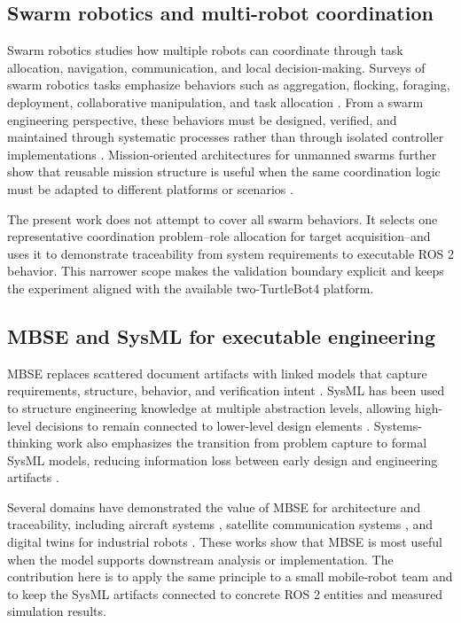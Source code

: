 \documentclass{ieeeaccess}
\begin{document}
\subsection{Swarm robotics and multi-robot coordination}
Swarm robotics studies how multiple robots can coordinate through task allocation, navigation, communication, and local decision-making. Surveys of swarm robotics tasks emphasize behaviors such as aggregation, flocking, foraging, deployment, collaborative manipulation, and task allocation \cite{Bayindir2016}. From a swarm engineering perspective, these behaviors must be designed, verified, and maintained through systematic processes rather than through isolated controller implementations \cite{Manuele2013}. Mission-oriented architectures for unmanned swarms further show that reusable mission structure is useful when the same coordination logic must be adapted to different platforms or scenarios \cite{Giles2019}.

The present work does not attempt to cover all swarm behaviors. It selects one representative coordination problem--role allocation for target acquisition--and uses it to demonstrate traceability from system requirements to executable ROS 2 behavior. This narrower scope makes the validation boundary explicit and keeps the experiment aligned with the available two-TurtleBot4 platform.

\subsection{MBSE and SysML for executable engineering}
MBSE replaces scattered document artifacts with linked models that capture requirements, structure, behavior, and verification intent \cite{Sannes2022,Zihang2024}. SysML has been used to structure engineering knowledge at multiple abstraction levels, allowing high-level decisions to remain connected to lower-level design elements \cite{Luca2011}. Systems-thinking work also emphasizes the transition from problem capture to formal SysML models, reducing information loss between early design and engineering artifacts \cite{Cloutier2015}.

Several domains have demonstrated the value of MBSE for architecture and traceability, including aircraft systems \cite{Li2019,Zhiyang2022}, satellite communication systems \cite{SuGao2019}, and digital twins for industrial robots \cite{Zhang2023}. These works show that MBSE is most useful when the model supports downstream analysis or implementation. The contribution here is to apply the same principle to a small mobile-robot team and to keep the SysML artifacts connected to concrete ROS 2 entities and measured simulation results.
\end{document}
